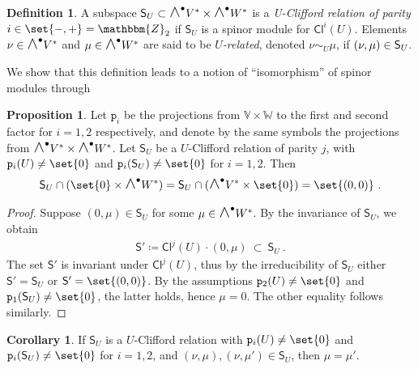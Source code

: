 \documentclass[a4paper, reqno, 11pt]{amsart}
\numberwithin{equation}{section}
\theoremstyle{definition}
\newtheorem{definition}[equation]{Definition}
\newtheorem{proposition}[equation]{Proposition}
\newtheorem{corollary}[equation]{Corollary}
\newcommand{\rmp}{\mathtt{p}}
\newcommand{\IZ}{\mathbbm{Z}}
\newcommand{\IV}{\mathbb{V}}
\newcommand{\IW}{\mathbb{W}}
\newcommand{\Cl}{\mathsf{Cl}}
\newcommand{\sfS}{{\mathsf{S}}}
\newcommand{\midwedge}{\text {\Large$\wedge$}}
\theoremstyle{remark}
\begin{document}
\begin{definition}\label{def:RCliffrel}
    A subspace ${\sf S}_U \subset \midwedge^\bullet V^* \times \midwedge^\bullet W^*$ is a \emph{U-Clifford relation of parity $i\in \set{-,+} = \IZ_2$} if $\sfS_U$ is a spinor module for $\Cl^i(U)$. Elements $\nu \in \midwedge^\bullet V^* $ and $\mu \in \midwedge^\bullet W^*$ are said to be \emph{$U$-related}, denoted $\nu \sim_U \mu$, if $(\nu,\mu) \in {\sf S}_U$.
\end{definition}

We show that this definition leads to a notion of \enquote{isomorphism} of spinor modules through

\begin{proposition}\label{prop:Uisomorphism}
    Let $\rmp_i$ be the projections from $\IV \times \IW$ to the first and second factor for $i=1,2$ respectively, and denote by the same symbols the projections from $\midwedge^\bullet V^* \times \midwedge^\bullet W^* $. Let $\sfS_U$ be a $U$-Clifford relation of parity $j$, with $\rmp_i(U) \neq \set{0}$ and $\rmp_i(\sfS_U) \neq \set{0}$ for $i=1,2$. Then
    \begin{align}
        \sfS_U \cap (\set{0} \times \midwedge^\bullet W^* ) = \sfS_U \cap (\midwedge^\bullet V^* \times \set{0} ) = \set{(0,0)} \ .
\end{align}
\end{proposition}

\begin{proof}
    Suppose $(0, \mu) \in \sfS_U$ for some $\mu \in \midwedge^\bullet W^*$. By the invariance of $\sfS_U$, we obtain
    \begin{align}
        \sfS' \coloneqq \mathsf{Cl}^j(U) \cdot (0, \mu) \ \subset \ \sfS_U \ .
    \end{align} 
    The set $\sfS'$ is invariant under $\mathsf{Cl}^j(U)$, thus by the irreducibility of $\sfS_U$ either $\sfS' = \sfS_U$ or $\sfS' = \set{(0,0)}$. By the assumptions $\rmp_2(U) \neq \set{0}$ and $\rmp_1(\sfS_U) \neq \set{0}$, the latter holds, hence $\mu = 0$. The other equality follows similarly.
\end{proof}

\begin{corollary}\label{cor:URinjective}
    If $\sfS_U$ is a $U$-Clifford relation with $\rmp_i(U) \neq \set{0}$ and $\rmp_i(\sfS_U) \neq \set{0}$ for $i=1,2$, and $(\nu, \mu), (\nu, \mu')\in \sfS_U$, then $\mu = \mu'$.
\end{corollary}
\end{document}
